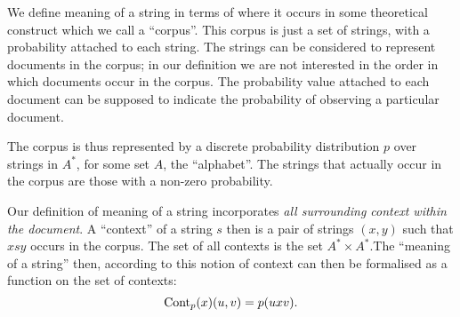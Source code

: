  
% 
% 


We define meaning of a string in terms of where it occurs in some theoretical construct which we call a ``corpus''. This corpus is just a set of strings, with a probability attached to each string. The strings can be considered to represent documents in the corpus; in our definition we are not interested in the order in which documents occur in the corpus. The probability value attached to each document can be supposed to indicate the probability of observing a particular document.

The corpus is thus represented by a discrete probability distribution $p$ over strings in $A^*$, for some set $A$, the ``alphabet''. The strings that actually occur in the corpus are those with a non-zero probability.

Our definition of meaning of a string incorporates \emph{all surrounding context within the document}. A ``context'' of a string $s$ then is a pair of strings $(x,y)$ such that $xsy$ occurs in the corpus. The set of all contexts is the set $A^* \times A^*$.The ``meaning of a string'' then, according to this notion of context can then be formalised as a function on the set of contexts:
$$\mathrm{Cont}_p(x)(u,v) = p(uxv).$$

